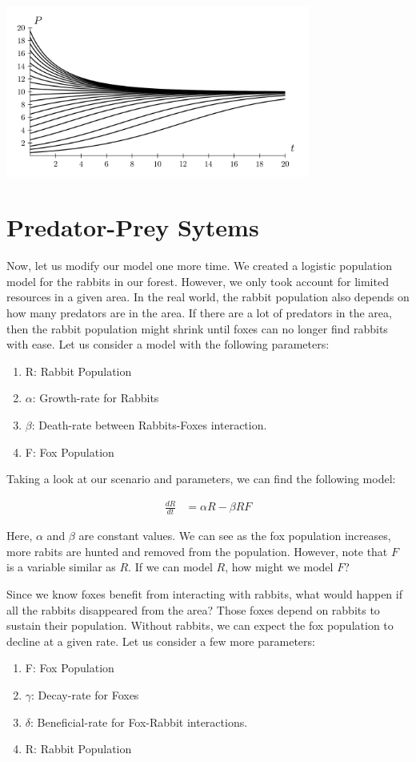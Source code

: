 \documentclass{amsart}
\theoremstyle{definition}
\numberwithin{equation}{section}
\begin{document}
\begin{sansmath}
\begin{center}
  \includegraphics[width=10cm]{LogisticGroup}
\end{center}

\section{Predator-Prey Sytems}

Now, let us modify our model one more time. We created a logistic population model for the rabbits in our forest. However, we only took account for limited resources in a given area. In the real world, the rabbit population also depends on how many predators are in the area. If there are a lot of predators in the area, then the rabbit population might shrink until foxes can no longer find rabbits with ease. Let us consider a model with the following parameters:
\begin{enumerate}
  \item R: Rabbit Population
  \item $\alpha$: Growth-rate for Rabbits
  \item $\beta$: Death-rate between Rabbits-Foxes interaction.
  \item F: Fox Population
\end{enumerate}

Taking a look at our scenario and parameters, we can find the following model:

\begin{align*}
  \frac{dR}{dt} & = \alpha R - \beta RF
\end{align*}

Here, $\alpha$ and $\beta$ are constant values. We can see as the fox population increases, more rabits are hunted and removed from the population. However, note that $F$ is a variable similar as $R$. If we can model $R$, how might we model $F$?

Since we know foxes benefit from interacting with rabbits, what would happen if all the rabbits disappeared from the area? Those foxes depend on rabbits to sustain their population. Without rabbits, we can expect the fox population to decline at a given rate. Let us consider a few more parameters:
\newpage
\begin{enumerate}
  \item F: Fox Population
  \item $\gamma$: Decay-rate for Foxes
  \item $\delta$: Beneficial-rate for Fox-Rabbit interactions.
  \item R: Rabbit Population
\end{enumerate}


\end{sansmath}
\end{document}
